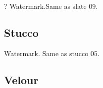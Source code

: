 \renewcommand{\Number}{01}\InputImage{\sfl}{\tco}{\sexdi}{\tco}{\sexdi}{\tco}
{}{}
\renewcommand{\Number}{02}\InputImage{\sfl}{\tco}{\sexor}{\tco}{\sexor}{\tco}
{?}{}
\renewcommand{\Number}{03}\InputImage{\sfl}{\tco}{\sexdi}{\tco}{\sexdi}{\tco}
{}{}
\renewcommand{\Number}{04}\InputImage{\sfl}{\tco}{\sfl}{\tco}{\sexdi}{\tco}
{}{}
\renewcommand{\Number}{05}\InputImage{\sfl}{\tco}{\sexdi}{\tco}{\sexdi}{\tco}
{}{}
\renewcommand{\Number}{06}\InputImage{\sfl}{\tco}{\sexdi}{\tco}{\sexdi}{\tco}
{}{}
\renewcommand{\Number}{07}\InputImage{\sfl}{\tco}{\sexdi}{\tco}{\sexdi}{\tbu}
{}{}
\renewcommand{\Number}{08}\InputImage{\sfl}{\tco}{\sfl}{\tco}{\sfl}{\tco}
{}{}
\renewcommand{\Number}{09}\InputImage{\sfl}{\tco}{\sexdi}{\tco}{\sexdi}{\tco}
{}{}
\renewcommand{\Number}{10}\InputImage{\sfl}{\tco}{\sexdi}{\tco}{\sexdi}{\tco}
{}{}
\renewcommand{\Number}{11}\InputImage{\sfl}{\tco}{\sexdi}{\tco}{\sexdi}{\tco}
{Watermark.}{Same as slate 09.}
\renewcommand{\Number}{12}\InputImage{\sfl}{\tco}{\sexdi}{\tco}{\sexdi}{\tco}
{}{}

\clearpage
\renewcommand{\mat}{Stucco}
\subsection{\mat}

\renewcommand{\Number}{01}\InputImage{\sfl}{\tsm}{\sro}{\tco}{\sro}{\tco}
{}{}
\renewcommand{\Number}{02}\InputImage{\sro}{\tco}{\sro}{\tco}{\sro}{\tco}
{Watermark.}{}
\renewcommand{\Number}{03}\InputImage{\sfl}{\tco}{\sfl}{\tco}{\sfl}{\tco}
{}{}
\renewcommand{\Number}{04}\InputImage{\sfl}{\tco}{\sfl}{\tco}{\sfl}{\tco}
{}{}
\renewcommand{\Number}{05}\InputImage{\sfl}{\tco}{\sro}{\tco}{\sro}{\tco}
{}{}
\renewcommand{\Number}{06}\InputImage{\sfl}{\tco}{\sro}{\tco}{\sro}{\tco}
{}{}
\renewcommand{\Number}{07}\InputImage{\sfl}{\tco}{\sfl}{\tco}{\sexdi}{\tbu}
{}{}
\renewcommand{\Number}{08}\InputImage{\sfl}{\tco}{\sfl}{\tco}{\sfl}{\tco}
{}{}
\renewcommand{\Number}{09}\InputImage{\sfl}{\tco}{\sfl}{\tco}{\sfl}{\tco}
{}{}
\renewcommand{\Number}{10}\InputImage{\sfl}{\tco}{\sro}{\tco}{\sro}{\tco}
{}{Same as stucco 05.}
\renewcommand{\Number}{11}\InputImage{\sfl}{\tco}{\sro}{\tco}{\sro}{\tco}
{}{}
\renewcommand{\Number}{12}\InputImage{\sfl}{\tco}{\sfl}{\tco}{\sfl}{\tco}
{}{}

\clearpage
\renewcommand{\mat}{Velour}
\subsection{\mat}

